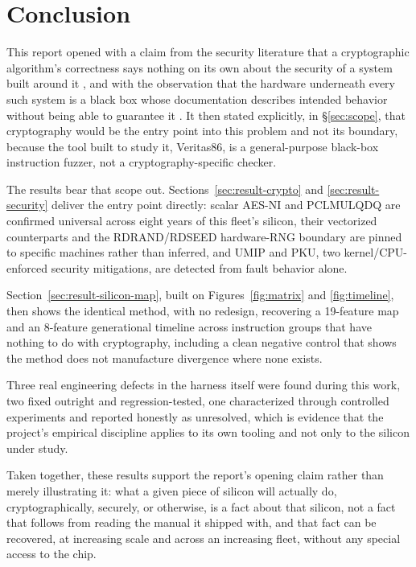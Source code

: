 \documentclass[11pt]{article}
\newcommand{\project}{Veritas86}
\begin{document}
\section{Conclusion}

This report opened with a claim from the security literature that a
cryptographic algorithm's correctness says nothing on its own about the
security of a system built around it \cite{anderson1993, kocher1996,
schneier1998}, and with the observation that the hardware underneath
every such system is a black box whose documentation describes intended
behavior without being able to guarantee it \cite{thompson1984,
king2008, becker2013, kocher2019spectre, lipp2018meltdown,
moghimi2023downfall}. It then stated explicitly, in \S\ref{sec:scope},
that cryptography would be the entry point into this problem and not
its boundary, because the tool built to study it, \project{}, is a
general-purpose black-box instruction fuzzer, not a cryptography-specific
checker.

The results bear that scope out. Sections~\ref{sec:result-crypto} and
\ref{sec:result-security} deliver the entry point directly: scalar
AES-NI and PCLMULQDQ are confirmed universal across eight years of this
fleet's silicon, their vectorized counterparts and the RDRAND/RDSEED
hardware-RNG boundary are pinned to specific machines rather than
inferred, and UMIP and PKU, two kernel/CPU-enforced security
mitigations, are detected from fault behavior alone.

Section~\ref{sec:result-silicon-map}, built on Figures~\ref{fig:matrix}
and \ref{fig:timeline}, then shows the identical method, with no
redesign, recovering a 19-feature map and an 8-feature generational
timeline across instruction groups that have nothing to do with
cryptography, including a clean negative control that shows the method
does not manufacture divergence where none exists.

Three real engineering defects in the harness itself were found during
this work, two fixed outright and regression-tested, one characterized
through controlled experiments and reported honestly as unresolved,
which is evidence that the project's empirical discipline applies to its
own tooling and not only to the silicon under study.

Taken together, these results support the report's opening claim rather
than merely illustrating it: what a given piece of silicon will
actually do, cryptographically, securely, or otherwise, is a fact about
that silicon, not a fact that follows from reading the manual it shipped
with, and that fact can be recovered, at increasing scale and across an
increasing fleet, without any special access to the chip.
\end{document}
